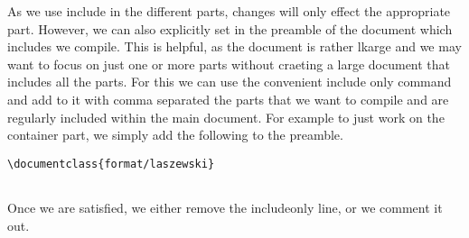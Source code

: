 As we use include in the different parts, changes will only effect the
appropriate part. However, we can also explicitly set in the preamble
of the document which includes we compile. This is helpful, as the
document is rather lkarge and we may want to focus on just one or more
parts without craeting a large document that includes all the parts.
For this we can use the convenient include only command and add to it
with comma separated the parts that we want to compile and are
regularly included within the main document. For example to just work
on the container part, we simply add the following to the preamble.

\begin{verbatim}
\documentclass{format/laszewski} 


\end{verbatim}

Once we are satisfied, we either remove the includeonly line, or we
comment it out.
